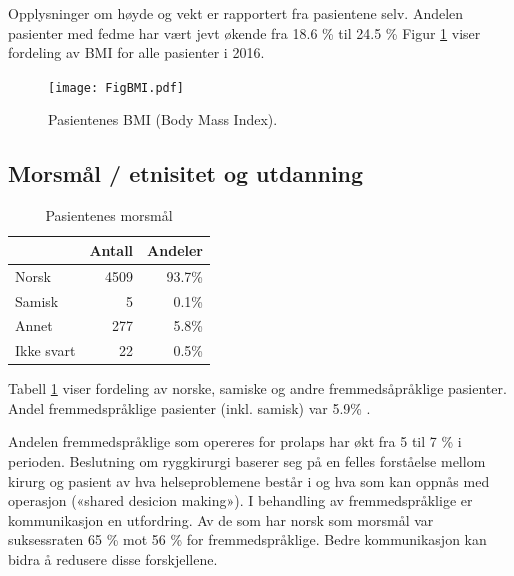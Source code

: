 \documentclass [norsk,a4paper,twoside]{article}\usepackage[]{graphicx}\usepackage[]{color}
\begin{document}
Opplysninger om høyde og vekt er rapportert fra pasientene selv.
Andelen pasienter med fedme har vært jevt økende fra 18.6 \%
til 24.5 \%
Figur \ref{fig:BMI} viser fordeling av BMI for alle pasienter i 2016. 

\begin{figure}[ht]
	\centering \texttt{[image: FigBMI.pdf]}
	\caption{\label{fig:BMI} Pasientenes BMI (Body Mass Index).}
\end{figure}





\subsection{Morsmål / etnisitet og utdanning}

\begin{table}[ht]
\centering
\begin{tabular}{lrr}
  \hline
 & Antall & Andeler \\ 
  \hline
Norsk & 4509 & 93.7\% \\ 
  Samisk & 5 & 0.1\% \\ 
  Annet & 277 & 5.8\% \\ 
  Ikke svart & 22 & 0.5\% \\ 
   \hline
\end{tabular}
\caption{Pasientenes morsmål} 
\label{tab:Morsm}
\end{table}


Tabell \ref{tab:Morsm} viser fordeling av norske, samiske og andre fremmedsåpråklige pasienter.
Andel fremmedspråklige pasienter (inkl. samisk) var 5.9\% . 

Andelen fremmedspråklige som opereres for prolaps har økt fra 5 til 7 \% i perioden.
Beslutning om ryggkirurgi baserer seg på en felles forståelse mellom kirurg og
pasient av hva helseproblemene består i og hva som kan oppnås med operasjon
(«shared desicion making»). I behandling av fremmedspråklige er kommunikasjon
en utfordring. Av de som har norsk som morsmål var suksessraten 65 \% mot 56 \%
for fremmedspråklige. Bedre kommunikasjon kan bidra å redusere disse
forskjellene.
\end{document}
